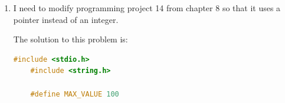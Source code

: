 \documentclass[12pt]{article}
\begin{document}
\begin{enumerate}[1.]
    I need to simplify programming project 2(b) by taking advantage of the fact that
    array name can be used as a pointer.

    \bigskip

    The solution to this problem is:

    \bigskip

\begin{lstlisting}[language=c]
    #include <stdio.h>
    #include <stdbool.h>
    #include <ctype.h>

    #define SIZE 100

    bool is_palindrome(char *p, char *q);

    int main(void) {
        char c, array[SIZE],
             *p = array,
             *q = array;

        // Read characters
        // Put characters into array
        printf("Enter a message: ");

        do {
            c = getchar();

            if (c == '\n') {
                break;
            }

            if (!isalpha(c)) {
                continue;
            }

            *q++ = tolower(c);
        } while (q < array + SIZE);
        // Set pointer to last element in the array
        q--;
        // Check if characters in array is palindrome
        if (is_palindrome(p,q)) {
            printf("Palindrome");
        } else {
            printf("Not a Palindrome");
        }

        return 0;
    }

    bool is_palindrome(char *p, char *q) {
        while (p < q) {
            if (*p++ != *q--) {
                return false;
            }
        }

        return true;
    }
\end{lstlisting}

    \item

    I need to modify programming project 14 from chapter 8 so that it uses a pointer
    instead of an integer.

    \bigskip

    The solution to this problem is:

    \bigskip

\begin{lstlisting}[language=c]
    #include <stdio.h>
    #include <string.h>

    #define MAX_VALUE 100


\end{lstlisting}
\end{enumerate}
\end{document}
